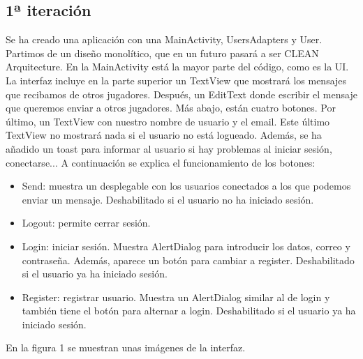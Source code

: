 \documentclass[a4paper,openright,12pt]{article}
\begin{document}
\subsection{1ª iteración}
Se ha creado una aplicación con una MainActivity, UsersAdapters y User. Partimos de un diseño monolítico, que en un futuro pasará a ser CLEAN Arquitecture. En la MainActivity está la mayor parte del código, como es la UI. La interfaz incluye en la parte superior un TextView que mostrará los mensajes que recibamos de otros jugadores. Después, un EditText donde escribir el mensaje que queremos enviar a otros jugadores. Más abajo, están cuatro botones. Por último, un TextView con nuestro nombre de usuario y el email. Este último TextView no mostrará nada si el usuario no está logueado. Además, se ha añadido un toast para informar al usuario si hay problemas al iniciar sesión, conectarse...
A continuación se explica el funcionamiento de los botones:
\begin{itemize}
    \item Send: muestra un desplegable con los usuarios conectados a los que podemos enviar un mensaje. Deshabilitado si el usuario no ha iniciado sesión.
    \item Logout: permite cerrar sesión.
    \item Login: iniciar sesión. Muestra AlertDialog para introducir los datos, correo y contraseña. Además, aparece un botón para cambiar a register. Deshabilitado si el usuario ya ha iniciado sesión.
    \item Register: registrar usuario. Muestra un AlertDialog similar al de login y también tiene el botón para alternar a login. Deshabilitado si el usuario ya ha iniciado sesión.
\end{itemize}
En la figura 1 se muestran unas imágenes de la interfaz. 
\end{document}
